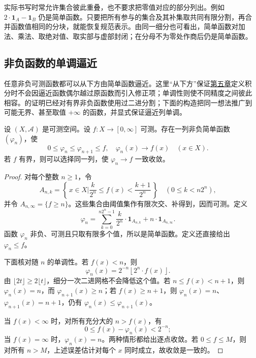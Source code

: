 实际书写时常允许集合彼此重叠，也不要求把零值对应的部分列出。例如
\(2\cdot\mathbf 1_A-\mathbf 1_B\) 仍是简单函数。只要把所有参与的集合及其补集取共同有限分割，再合并函数值相同的分块，就能恢复规范表示。由同一细分也可看出，简单函数对加法、乘法、取绝对值、取实部与虚部封闭；在分母不为零处作商后仍是简单函数。

\subsection{非负函数的单调逼近}
\label{b1:subsec:040302}

任意非负可测函数都可以从下方由简单函数逼近。这里“从下方”保证\hyperref[b1:ch:05]{第五章}定义积分时不会因逼近函数偶尔越过原函数而引入修正项；单调性则使不同精度之间彼此相容。的证明已经对有界非负函数使用过二进分割；下面的构造把同一想法推广到可能无界、甚至取值 \(+\infty\) 的函数，并显式保证逼近列单调。

\begin{theorem}
\label{b1:thm:nonnegative-simple-approximation}
设 \((X,\mathcal A)\) 是可测空间。设 \(f:X\rightarrow[0,\infty]\) 可测。存在一列非负简单函数 \((\varphi_n)\)，使
\[
0\leq\varphi_n\leq\varphi_{n+1}\leq f,
\quad
\varphi_n(x)\longrightarrow f(x)
\quad(x\in X).
\]
若 \(f\) 有界，则可以选择同一列，使 \(\varphi_n\to f\) 一致收敛。
\end{theorem}
\begin{proof}
对每个整数 \(n\geq1\)，令
\[
A_{n,k}
=\left\{\,x\in X\mathrel{\big|}\frac{k}{2^n}\leq f(x)<\frac{k+1}{2^n}\,\right\}
\quad\left(0\leq k<n2^n\right),
\]
并令 \(A_{n,\infty}=\{f\geq n\}\)。这些集合由阈值集作有限次交、补得到，因而可测。定义
\[
\varphi_n
=\sum_{k=0}^{n2^n-1}\frac{k}{2^n}\cdot\mathbf 1_{A_{n,k}}
+n\cdot\mathbf 1_{A_{n,\infty}}.
\]
函数 \(\varphi_n\) 非负、可测且只取有限多个值，所以是简单函数。定义还直接给出 \(\varphi_n\leq f\)。

下面核对随 \(n\) 的单调性。若 \(f(x)<n\)，则
\[
\varphi_n(x)=2^{-n}\left\lfloor2^n\cdot f(x)\right\rfloor.
\]
由 \(\lfloor2t\rfloor\geq2\lfloor t\rfloor\)，细分一次二进网格不会降低这个值。若 \(n\leq f(x)<n+1\)，则
\(\varphi_n(x)=n\)，而 \(\varphi_{n+1}(x)\geq n\)；若 \(f(x)\geq n+1\)，则
\(\varphi_n(x)=n\)、\(\varphi_{n+1}(x)=n+1\)，仍有
\(\varphi_n(x)\leq\varphi_{n+1}(x)\)。

当 \(f(x)<\infty\) 时，对所有充分大的 \(n>f(x)\)，有
\[
0\leq f(x)-\varphi_n(x)<2^{-n};
\]
当 \(f(x)=\infty\) 时，\(\varphi_n(x)=n\)。两种情形都给出逐点收敛。若 \(0\leq f\leq M\)，则对所有 \(n>M\)，上述误差估计对每个 \(x\) 同时成立，故收敛是一致的。
\end{proof}

